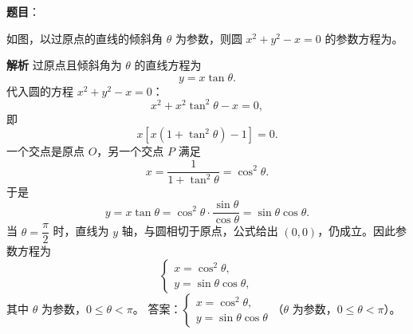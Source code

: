 \begin{answer}

\textbf{题目}：

如图，以过原点的直线的倾斜角 $\theta$ 为参数，则圆 $x^2+y^2-x=0$ 的参数方程为\gkblank{}。
\nopagebreak[4]
\begin{center}\end{center}
\nopagebreak[4]
\textbf{解析}
过原点且倾斜角为 $\theta$ 的直线方程为
\nopagebreak[4]
\[y=x\tan\theta.\]
代入圆的方程 $x^2+y^2-x=0$：
\nopagebreak[4]
\[x^2+x^2\tan^2\theta-x=0,\]
即
\nopagebreak[4]
\[x\left[x(1+\tan^2\theta)-1\right]=0.\]
一个交点是原点 $O$，另一个交点 $P$ 满足
\nopagebreak[4]
\[x=\frac1{1+\tan^2\theta}=\cos^2\theta.\]
于是
\nopagebreak[4]
\[y=x\tan\theta=\cos^2\theta\cdot\frac{\sin\theta}{\cos\theta}
=\sin\theta\cos\theta.\]
当 $\theta=\dfrac\pi2$ 时，直线为 $y$ 轴，与圆相切于原点，公式给出 $(0,0)$，仍成立。因此参数方程为
\nopagebreak[4]
\[\begin{cases}
x=\cos^2\theta,\\[4pt]
y=\sin\theta\cos\theta,
\end{cases}\]
其中 $\theta$ 为参数，$0\leqslant\theta<\pi$。
答案：$\begin{cases}x=\cos^2\theta,\\y=\sin\theta\cos\theta\end{cases}$（$\theta$ 为参数，$0\leqslant\theta<\pi$）。


\end{answer}
